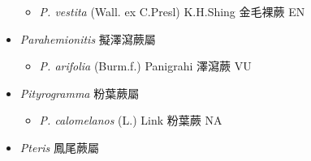 \begin{itemize}
  \begin{itemize}
        \item[] \textit{P. vestita} (Wall. ex C.Presl) K.H.Shing  金毛裸蕨   EN
  \end{itemize}
 \item[] \textit{Parahemionitis} 擬澤瀉蕨屬
                                
  \begin{itemize}
        \item[] \textit{P. arifolia} (Burm.f.) Panigrahi  澤瀉蕨   VU
  \end{itemize}
 \item[] \textit{Pityrogramma} 粉葉蕨屬
                                
  \begin{itemize}
        \item[] \textit{P. calomelanos} (L.) Link  粉葉蕨   NA
  \end{itemize}
 \item[] \textit{Pteris} 鳳尾蕨屬
                                

\end{itemize}
